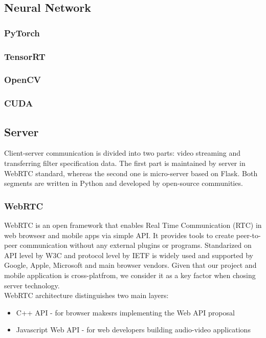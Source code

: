 \documentclass[../Main.tex]{subfiles}
\begin{document}
\subsection{Neural Network}
    \subsubsection{PyTorch}
    \subsubsection{TensorRT}
    \subsubsection{OpenCV}
    \subsubsection{CUDA}
    
\subsection{Server}
    Client-server communication is divided into two parts: video streaming and transferring filter specification data. The first part is maintained by server in WebRTC standard, whereas the second one is micro-server based on Flask. Both segments are written in Python and developed by open-source communities.

    \subsubsection{WebRTC}
    WebRTC is an open framework that enables Real Time Communication (RTC) in web browsesr and mobile apps via simple API. It provides tools to create peer-to-peer communication without any external plugins or programs. Standarized on API level by W3C  and protocol level by IETF  is widely used and supported by Google, Apple, Microsoft and main browser vendors. Given that our project and mobile application is cross-platfrom, we consider it as a key factor when chosing server technology. \\
    WebRTC architecture distinguishes two main layers: 
    \begin{itemize}
    \item C++ API - for browser makesrs implementing the Web API proposal
    \item Javascript Web API - for web developers building audio-video applications
    \end{itemize}
\end{document}
